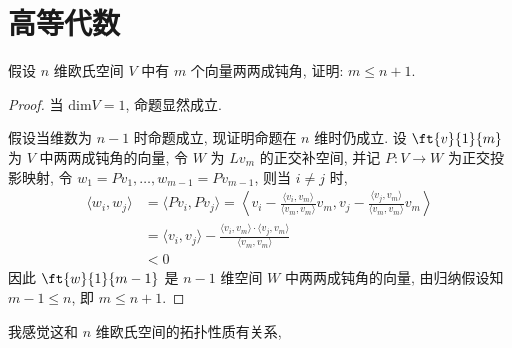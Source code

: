 \chapter{高等代数}
    \begin{problem}
        假设 $n$ 维欧氏空间 $V$ 中有 $m$ 个向量两两成钝角, 
        证明: $m\leqslant n+1$.
    \end{problem}

    \begin{proof}
        当 $\mathrm{dim}V = 1$, 命题显然成立.

        假设当维数为 $n-1$ 时命题成立, 
        现证明命题在 $n$ 维时仍成立.
         设 $\ft{v}{1}{m}$ 为 $V$ 中两两成钝角的向量, 
        令 $W$ 为 $Lv_m$ 的正交补空间, 
        并记 $P:V\rightarrow W$ 为正交投影映射, 
        令 $w_1=Pv_1,\dots,w_{m-1}=Pv_{m-1}$, 则当 $i\neq j$ 时, 
        \begin{align*}
            \langle w_i, w_j \rangle 
            &= \langle Pv_i,Pv_j \rangle 
            = \left\langle v_i-\frac{\langle v_i,v_m \rangle}
            {\langle v_m,v_m \rangle}v_m, 
            v_j-\frac{\langle v_j,v_m \rangle}
            {\langle v_m,v_m \rangle}v_m\right\rangle \\
            &=\langle v_i,v_j \rangle - 
            \frac{\langle v_i,v_m \rangle\cdot
            \langle v_j,v_m \rangle}{\langle v_m,v_m \rangle} \\
            &<0
        \end{align*}
        因此 $\ft{w}{1}{m-1}$ 是 $n-1$ 维空间 $W$ 中两两成钝角的向量, 
        由归纳假设知 $m-1\leqslant n$, 即 $m\leqslant n+1$.
    \end{proof}
    \begin{remark}
        我感觉这和 $n$ 维欧氏空间的拓扑性质有关系, 
    \end{remark}
    \newpage

